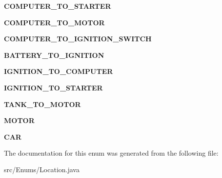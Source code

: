 \begin{DoxyCompactItemize}
\item 
\hypertarget{enumEnums_1_1Location_a6387bd1ff82f5182e80237b06aa1f62c}{}{\bfseries C\+O\+M\+P\+U\+T\+E\+R\+\_\+\+T\+O\+\_\+\+S\+T\+A\+R\+T\+E\+R}\label{enumEnums_1_1Location_a6387bd1ff82f5182e80237b06aa1f62c}

\item 
\hypertarget{enumEnums_1_1Location_a002bde27aed95c7ca43d9c2a649ab9e0}{}{\bfseries C\+O\+M\+P\+U\+T\+E\+R\+\_\+\+T\+O\+\_\+\+M\+O\+T\+O\+R}\label{enumEnums_1_1Location_a002bde27aed95c7ca43d9c2a649ab9e0}

\item 
\hypertarget{enumEnums_1_1Location_a0fdaa31f230abe7d2246e9be47329f88}{}{\bfseries C\+O\+M\+P\+U\+T\+E\+R\+\_\+\+T\+O\+\_\+\+I\+G\+N\+I\+T\+I\+O\+N\+\_\+\+S\+W\+I\+T\+C\+H}\label{enumEnums_1_1Location_a0fdaa31f230abe7d2246e9be47329f88}

\item 
\hypertarget{enumEnums_1_1Location_a54f4c973eda7c23daa2d4798a2dd01c1}{}{\bfseries B\+A\+T\+T\+E\+R\+Y\+\_\+\+T\+O\+\_\+\+I\+G\+N\+I\+T\+I\+O\+N}\label{enumEnums_1_1Location_a54f4c973eda7c23daa2d4798a2dd01c1}

\item 
\hypertarget{enumEnums_1_1Location_a904b45f5356d2cad686a41584038e53e}{}{\bfseries I\+G\+N\+I\+T\+I\+O\+N\+\_\+\+T\+O\+\_\+\+C\+O\+M\+P\+U\+T\+E\+R}\label{enumEnums_1_1Location_a904b45f5356d2cad686a41584038e53e}

\item 
\hypertarget{enumEnums_1_1Location_a11bbd0d76e5b4e9e52de8772c5eb3e21}{}{\bfseries I\+G\+N\+I\+T\+I\+O\+N\+\_\+\+T\+O\+\_\+\+S\+T\+A\+R\+T\+E\+R}\label{enumEnums_1_1Location_a11bbd0d76e5b4e9e52de8772c5eb3e21}

\item 
\hypertarget{enumEnums_1_1Location_a800ee70c357ad67398cdbb147450c889}{}{\bfseries T\+A\+N\+K\+\_\+\+T\+O\+\_\+\+M\+O\+T\+O\+R}\label{enumEnums_1_1Location_a800ee70c357ad67398cdbb147450c889}

\item 
\hypertarget{enumEnums_1_1Location_a8fa1b5fa22e86d2bf5d77fa9c03b94c1}{}{\bfseries M\+O\+T\+O\+R}\label{enumEnums_1_1Location_a8fa1b5fa22e86d2bf5d77fa9c03b94c1}

\item 
\hypertarget{enumEnums_1_1Location_a96c1b03c53864a085b5df209df55c11c}{}{\bfseries C\+A\+R}\label{enumEnums_1_1Location_a96c1b03c53864a085b5df209df55c11c}

\end{DoxyCompactItemize}


The documentation for this enum was generated from the following file\+:\begin{DoxyCompactItemize}
\item 
src/\+Enums/Location.\+java\end{DoxyCompactItemize}
